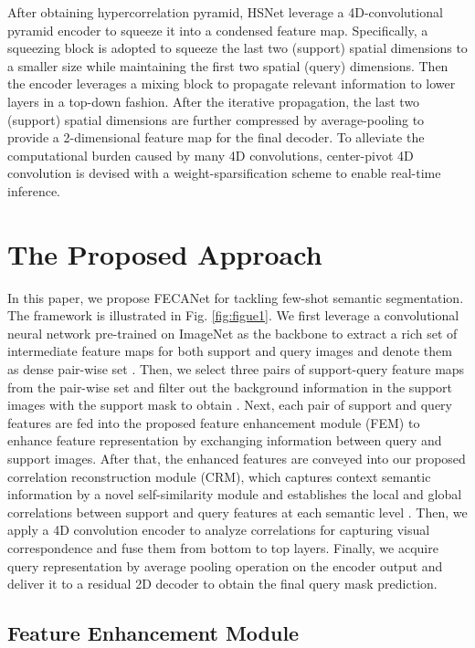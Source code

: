 \documentclass[journal]{IEEEtran}
\begin{document}
	After obtaining hypercorrelation pyramid, HSNet leverage a 4D-convolutional pyramid encoder to squeeze it into a condensed feature map. Specifically, a squeezing block is adopted to squeeze the last two (support) spatial dimensions to a smaller size while maintaining the first two spatial (query) dimensions. Then the encoder leverages a mixing block to propagate relevant information to lower layers in a top-down fashion. After the iterative propagation, the last two (support) spatial dimensions are further compressed by average-pooling to provide a 2-dimensional feature map for the final decoder. To alleviate the computational burden caused by many 4D convolutions, center-pivot 4D convolution is devised with a weight-sparsification scheme to enable real-time inference.


\section{The Proposed Approach}
\label{approach}




In this paper, we propose FECANet for tackling few-shot semantic segmentation. The framework is illustrated in Fig. \ref{fig:figue1}. We first leverage a convolutional neural network pre-trained on ImageNet as the backbone to extract a rich set of intermediate feature maps for both support and query images and denote them as dense pair-wise set . Then, we select three pairs of support-query feature maps from the pair-wise set and filter out the background information in the support images with the support mask to obtain . Next, each pair of support and query features are fed into the proposed feature enhancement module (FEM) to enhance feature representation by exchanging information between query and support images. After that, the enhanced features  are conveyed into our proposed correlation reconstruction module (CRM), which captures context semantic information by a novel self-similarity module and establishes the local and global correlations between support and query features at each semantic level . Then, we apply a 4D convolution encoder to analyze correlations for capturing visual correspondence and fuse them from bottom to top layers. Finally, we acquire query representation by average pooling operation on the encoder output and deliver it to a residual 2D decoder to obtain the final query mask prediction. 




\subsection{Feature Enhancement Module}
\end{document}
